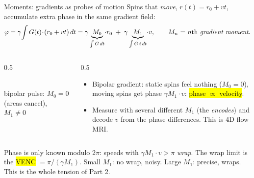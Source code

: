\begin{frame}{Moments: gradients as probes of motion}
Spins that \emph{move}, $r(t)=r_0+vt$, accumulate extra phase in the same gradient field:
\[ \varphi=\gamma\!\int G(t)\!\cdot\!(r_0+vt)\,dt=\gamma\underbrace{M_0}_{\int G\,dt}\!\cdot r_0\;+\;\gamma\underbrace{M_1}_{\int G\,t\,dt}\!\cdot v,\qquad\text{$M_n$ = $n$th \emph{gradient moment}.} \]
\pause
\begin{columns}[c]
\begin{column}{0.5\textwidth}
\centering
{}\\[-1mm]
{\scriptsize bipolar pulse: $M_0=0$ (areas cancel), $M_1\neq0$}
\end{column}
\begin{column}{0.5\textwidth}
\small
\begin{itemize}
\item Bipolar gradient: static spins feel nothing ($M_0=0$), moving spins get phase $\gamma M_1\!\cdot v$: \hl{phase $\propto$ velocity}.
\item Measure with several different $M_1$ (the \emph{encodes}) and decode $v$ from the phase differences. This is 4D flow MRI.
\end{itemize}
\end{column}
\end{columns}
\pause
\smallskip
\small Phase is only known modulo $2\pi$: speeds with $\gamma M_1\!\cdot v>\pi$ \emph{wrap}. The wrap limit is the \hl{VENC} $=\pi/(\gamma M_1)$. Small $M_1$: no wrap, noisy. Large $M_1$: precise, wraps. This is the whole tension of Part 2.
\end{frame}


